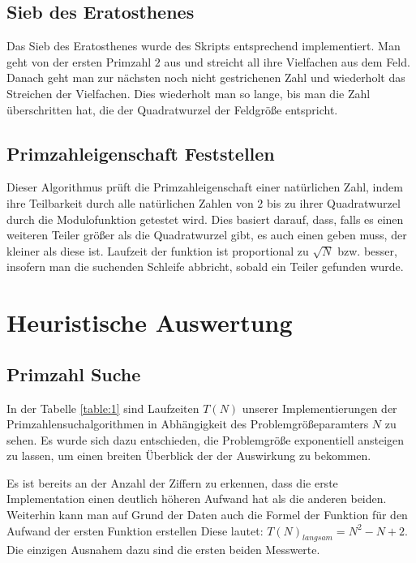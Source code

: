 \documentclass[paper=a4, fontsize=11pt]{scrartcl} %
\numberwithin{equation}{section} %
\numberwithin{figure}{section} %
\numberwithin{table}{section} %
\begin{document}
\subsection{Sieb des Eratosthenes}\label{secEras}
Das Sieb des Eratosthenes wurde des Skripts entsprechend implementiert. Man geht
von der ersten Primzahl $2$ aus und streicht all ihre Vielfachen aus dem Feld. Danach
geht man zur n\"achsten noch nicht gestrichenen Zahl und wiederholt das Streichen der
Vielfachen. Dies wiederholt man so lange, bis man die Zahl \"uberschritten hat, die
der Quadratwurzel der Feldgr\"o{\ss}e entspricht.

\subsection{Primzahleigenschaft Feststellen}\label{secCheck}
Dieser Algorithmus pr\"uft die Primzahleigenschaft einer nat\"urlichen Zahl, indem
ihre Teilbarkeit durch alle nat\"urlichen Zahlen von $2$ bis zu ihrer Quadratwurzel
durch die Modulofunktion getestet wird. Dies basiert darauf, dass, falls es einen
weiteren Teiler gr\"o{\ss}er als die Quadratwurzel gibt, es auch einen geben muss,
der kleiner als diese ist. Laufzeit der funktion ist proportional zu $\sqrt{N}$ bzw.
besser, insofern man die suchenden Schleife abbricht, sobald ein Teiler gefunden wurde.


\section{Heuristische Auswertung}

\subsection{Primzahl Suche}

In der Tabelle \ref{table:1} sind Laufzeiten $T(N)$ unserer Implementierungen der
Primzahlensuchalgorithmen in Abh\"angigkeit des Problemgr\"o{\ss}eparamters $N$
zu sehen. Es wurde sich dazu entschieden, die Problemgr\"o{\ss}e exponentiell
ansteigen zu lassen, um einen breiten \"Uberblick der der Auswirkung zu bekommen.

Es ist bereits an  der Anzahl der Ziffern zu erkennen, dass die erste Implementation
einen deutlich h\"oheren Aufwand hat als die anderen beiden. Weiterhin kann man auf
Grund der Daten auch die Formel der Funktion f\"ur den Aufwand der ersten Funktion erstellen
Diese lautet: $T(N)_{langsam} = N^2 -N +2$. Die einzigen Ausnahem dazu sind die ersten
beiden Messwerte.
\end{document}

